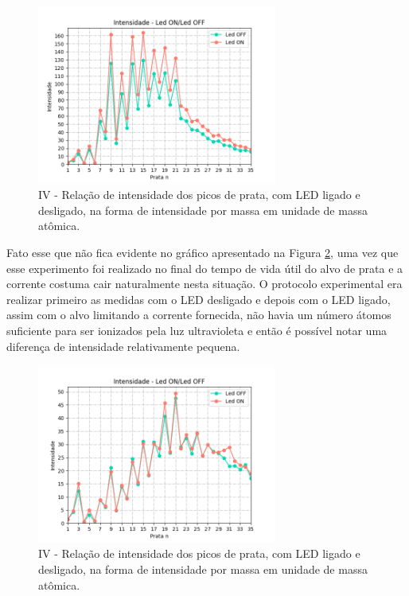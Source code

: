   \begin{figure}
  \centering  
  \includegraphics[width=0.7\textwidth]{exp_04/LED_ON_Led_OFF_intensidade_prata_N_.png}
  \caption{IV - Relação de intensidade dos picos de prata, com LED ligado e desligado, na forma de intensidade por massa em unidade de massa atômica.}
  \label{fig:exp_04_picos_LEDONOFF_N}
\end{figure}

Fato esse que não fica evidente no gráfico apresentado na Figura \ref{fig:exp_03_picos_LEDONOFF_N}, uma vez que esse experimento foi realizado no final do tempo de vida útil do alvo de prata e a corrente costuma cair naturalmente nesta situação. O protocolo experimental era realizar primeiro as medidas com o LED desligado e depois com o LED ligado, assim com o alvo limitando a corrente fornecida, não havia um número átomos suficiente para ser ionizados pela luz ultravioleta e então é possível notar uma diferença de intensidade relativamente pequena.  

\begin{figure}
  \centering  
  \includegraphics[width=0.7\textwidth]{exp_03/LED_ON_Led_OFF_intensidade_prata_N_.png}
  \caption{IV - Relação de intensidade dos picos de prata, com LED ligado e desligado, na forma de intensidade por massa em unidade de massa atômica.}
  \label{fig:exp_03_picos_LEDONOFF_N}
\end{figure}
